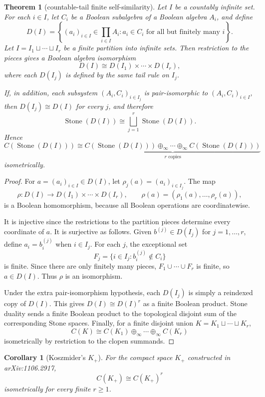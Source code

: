 \documentclass[11pt]{article}
\newtheorem{theorem}{Theorem}
\newtheorem{corollary}{Corollary}
\newcommand{\Stone}{\operatorname{Stone}}
\newcommand{\cinf}{\oplus_{\infty}}
\begin{document}
\begin{theorem}[countable-tail finite self-similarity]
Let $I$ be a countably infinite set. For each $i\in I$, let $C_i$ be a Boolean subalgebra of a Boolean algebra $A_i$, and define
\[
 D(I)=
 \left\{ (a_i)_{i\in I}\in \prod_{i\in I} A_i :
        a_i\in C_i \text{ for all but finitely many } i
 \right\}.
\]
Let $I=I_1\sqcup \cdots \sqcup I_r$ be a finite partition into infinite sets. Then restriction to the pieces gives a Boolean algebra isomorphism
\[
  D(I) \cong D(I_1)\times\cdots\times D(I_r),
\]
where each $D(I_j)$ is defined by the same tail rule on $I_j$.

If, in addition, each subsystem $(A_i,C_i)_{i\in I_j}$ is pair-isomorphic to $(A_i,C_i)_{i\in I}$, then $D(I_j)\cong D(I)$ for every $j$, and therefore
\[
  \Stone(D(I)) \cong \bigsqcup_{j=1}^r \Stone(D(I)).
\]
Hence
\[
  C(\Stone(D(I))) \cong
  \underbrace{C(\Stone(D(I))) \cinf \cdots \cinf C(\Stone(D(I)))}_{r\text{ copies}}
\]
isometrically.
\end{theorem}

\begin{proof}
For $a=(a_i)_{i\in I}\in D(I)$, let $\rho_j(a)=(a_i)_{i\in I_j}$. The map
\[
 \rho:D(I)\to D(I_1)\times\cdots\times D(I_r),
 \qquad
 \rho(a)=(\rho_1(a),\ldots,\rho_r(a)),
\]
is a Boolean homomorphism, because all Boolean operations are coordinatewise.

It is injective since the restrictions to the partition pieces determine every coordinate of $a$.
It is surjective as follows. Given $b^{(j)}\in D(I_j)$ for $j=1,\ldots,r$, define $a_i=b_i^{(j)}$ when $i\in I_j$. For each $j$, the exceptional set
\[
 F_j=\{i\in I_j: b_i^{(j)}\notin C_i\}
\]
is finite. Since there are only finitely many pieces, $F_1\cup\cdots\cup F_r$ is finite, so $a\in D(I)$. Thus $\rho$ is an isomorphism.

Under the extra pair-isomorphism hypothesis, each $D(I_j)$ is simply a reindexed copy of $D(I)$. This gives $D(I)\cong D(I)^r$ as a finite Boolean product. Stone duality sends a finite Boolean product to the topological disjoint sum of the corresponding Stone spaces. Finally, for a finite disjoint union $K=K_1\sqcup\cdots\sqcup K_r$,
\[
 C(K) \cong C(K_1)\cinf\cdots\cinf C(K_r)
\]
isometrically by restriction to the clopen summands.
\end{proof}

\begin{corollary}[Koszmider's $K_+$]
For the compact space $K_+$ constructed in arXiv:1106.2917,
\[
 C(K_+) \cong C(K_+)^r
\]
isometrically for every finite $r\geq 1$.
\end{corollary}
\end{document}
